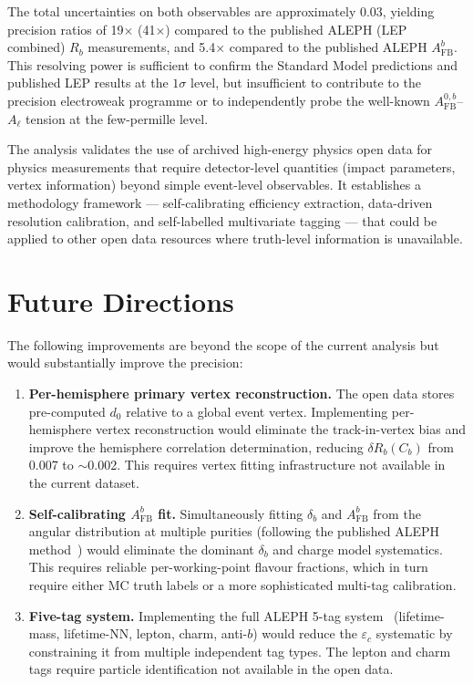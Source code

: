 \documentclass[11pt,a4paper]{article}
\begin{document}
The total uncertainties on both observables are approximately 0.03,
yielding precision ratios of 19$\times$ (41$\times$) compared to the
published ALEPH (LEP combined) $R_b$ measurements, and 5.4$\times$
compared to the published ALEPH $A_\mathrm{FB}^b$.  This resolving power
is sufficient to confirm the Standard Model predictions and published LEP
results at the $1\sigma$ level, but insufficient to contribute to the
precision electroweak programme or to independently probe the well-known
$A_\mathrm{FB}^{0,b}$--$A_\ell$ tension at the few-permille level.

The analysis validates the use of archived high-energy physics open data
for physics measurements that require detector-level quantities
(impact parameters, vertex information) beyond simple event-level
observables.  It establishes a methodology framework --- self-calibrating
efficiency extraction, data-driven resolution calibration, and
self-labelled multivariate tagging --- that could be applied to other
open data resources where truth-level information is unavailable.

\section{Future Directions}
\label{sec:future}

The following improvements are beyond the scope of the current analysis
but would substantially improve the precision:

\begin{enumerate}
\item \textbf{Per-hemisphere primary vertex reconstruction.}
  The open data stores pre-computed $d_0$ relative to a global event
  vertex.  Implementing per-hemisphere vertex reconstruction would
  eliminate the track-in-vertex bias and improve the hemisphere
  correlation determination, reducing $\delta R_b(C_b)$ from 0.007
  to $\sim$0.002.  This requires vertex fitting infrastructure not
  available in the current dataset.

\item \textbf{Self-calibrating $A_\mathrm{FB}^b$ fit.}
  Simultaneously fitting $\delta_b$ and $A_\mathrm{FB}^b$ from the
  angular distribution at multiple purities (following the published
  ALEPH method~\cite{ALEPH:AFBb}) would eliminate the dominant
  $\delta_b$ and charge model systematics.  This requires reliable
  per-working-point flavour fractions, which in turn require either
  MC truth labels or a more sophisticated multi-tag calibration.

\item \textbf{Five-tag system.}
  Implementing the full ALEPH 5-tag system~\cite{ALEPH:Rb:1996}
  (lifetime-mass, lifetime-NN, lepton, charm, anti-$b$) would reduce
  the $\varepsilon_c$ systematic by constraining it from multiple
  independent tag types.  The lepton and charm tags require particle
  identification not available in the open data.
\end{enumerate}
\end{document}
